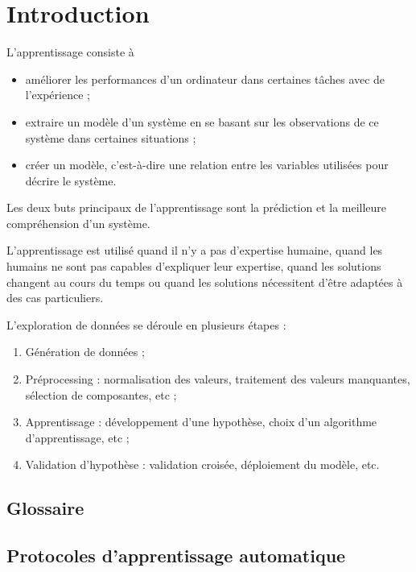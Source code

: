\chapter{Introduction}

L'apprentissage consiste à

\begin{itemize}
	\item améliorer les performances d'un ordinateur dans certaines tâches avec de l'expérience ;
	\item extraire un modèle d'un système en se basant sur les observations de ce système dans certaines situations ;
	\item créer un modèle, c'est-à-dire une relation entre les variables utilisées pour décrire le système.
\end{itemize}

Les deux buts principaux de l'apprentissage sont la prédiction et la meilleure compréhension d'un système.

L'apprentissage est utilisé quand il n'y a pas d'expertise humaine, quand les humains ne sont pas capables d'expliquer leur expertise, quand les solutions changent au cours du temps ou quand les solutions nécessitent d'être adaptées à des cas particuliers.


L'exploration de données se déroule en plusieurs étapes :

\begin{enumerate}
	\item Génération de données ;
	\item Préprocessing : normalisation des valeurs, traitement des valeurs manquantes, sélection de composantes, etc ;
	\item Apprentissage : développement d'une hypothèse, choix d'un algorithme d'apprentissage, etc ;
	\item Validation d'hypothèse : validation croisée, déploiement du modèle, etc.
\end{enumerate}

	\section{Glossaire}
	

	\section{Protocoles d'apprentissage automatique}
		
